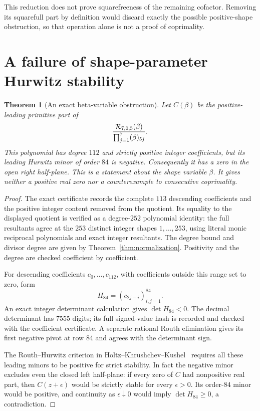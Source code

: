 \documentclass[11pt]{article}
\newtheorem{theorem}{Theorem}
\begin{document}
This reduction does not prove squarefreeness of the remaining cofactor.
Removing its squarefull part by definition would discard exactly the
possible positive-shape obstruction, so that operation alone is not a
proof of coprimality.

\section{A failure of shape-parameter Hurwitz stability}

\begin{theorem}[An exact beta-variable obstruction]\label{thm:beta-hurwitz}
Let $C(\beta)$ be the positive-leading primitive part of
\[
 \frac{{\cal R}_{7,0,5}(\beta)}
      {\prod_{j=1}^7(\beta)_{5j}} .
\]
This polynomial has degree $112$ and strictly positive integer
coefficients, but its leading Hurwitz minor of order $84$ is negative.
Consequently it has a zero in the open right half-plane.
This is a statement about the shape variable $\beta$.
It gives neither a positive real zero nor a counterexample to
consecutive coprimality.
\end{theorem}
\begin{proof}
The exact certificate records the complete $113$ descending coefficients
and the positive integer content removed from the quotient.
Its equality to the displayed quotient is verified as a degree-$252$
polynomial identity: the full resultants agree at the $253$ distinct
integer shapes $1,\ldots,253$, using literal monic reciprocal
polynomials and exact integer resultants.
The degree bound and divisor degree are given by
Theorem~\ref{thm:normalization}. Positivity and the degree are checked
coefficient by coefficient.

For descending coefficients $c_0,\ldots,c_{112}$, with coefficients
outside this range set to zero, form
\[
 H_{84}=(c_{2j-i})_{i,j=1}^{84}.
\]
An exact integer determinant calculation gives $\det H_{84}<0$.
The decimal determinant has $7555$ digits; its full signed-value hash
is recorded and checked with the coefficient certificate.
A separate rational Routh elimination gives its first negative pivot
at row $84$ and agrees with the determinant sign.

The Routh--Hurwitz criterion in
Holtz--Khrushchev--Kushel~\cite[Theorem~1, p.~1]{HKK} requires all
these leading minors to be positive for strict stability.
In fact the negative minor excludes even the closed left half-plane:
if every zero of $C$ had nonpositive real part, then
$C(z+\epsilon)$ would be strictly stable for every $\epsilon>0$.
Its order-$84$ minor would be positive, and continuity as
$\epsilon\downarrow0$ would imply $\det H_{84}\ge0$, a contradiction.
\end{proof}
\end{document}
